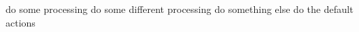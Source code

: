 \documentclass{article}
\begin{document}
\begin{algorithmic}[1]
\STATE do some processing
\STATEx do some different processing
\STATEx do something else
\ELSE
\STATE do the default actions
\ENDIF
\end{algorithmic}
\end{document}
